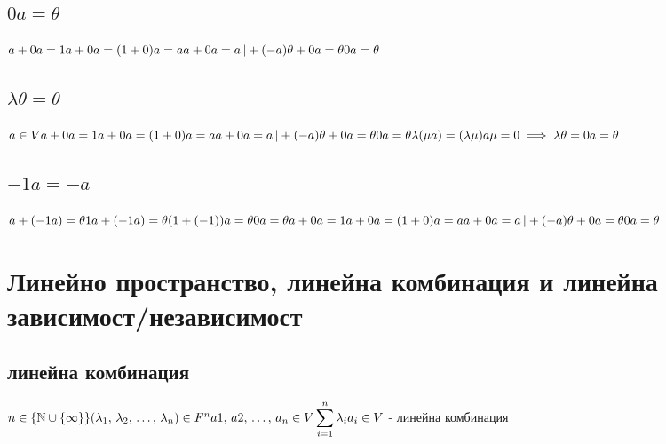 \documentclass{article}
\begin{document}
    \subsection{\(0a = \theta\)}
    \(a + 0a = 1a + 0a = (1 + 0)a = a\\
    a + 0a = a \, | + (-a)\\
    \theta + 0a = \theta\\
    0a = \theta\)
    \subsection{\(\lambda \theta = \theta\)}
    \(a \in V\\
    a + 0a = 1a + 0a = (1 + 0)a = a\\
    a + 0a = a \, | + (-a)\\
    \theta + 0a = \theta\\
    0a = \theta\\
    \lambda(\mu a) = (\lambda \mu)a\\
    \mu = 0\\
    \implies \lambda \theta = 0a = \theta\)
    \subsection{\(-1a = -a\)}
    \(a + (-1a) = \theta\\
    1a + (-1a) = \theta\\
    (1 + (-1))a = \theta\\
    0a = \theta\\
    a + 0a = 1a + 0a = (1 + 0)a = a\\
    a + 0a = a \, | + (-a)\\
    \theta + 0a = \theta\\
    0a = \theta\)
    \section{Линейно пространство, линейна комбинация и линейна зависимост/независимост}
    \subsection{линейна комбинация}
    \(n \in \{\mathbb{N} \cup \{ \infty \}\}\\
    (\lambda_1, \, \lambda_2, \, \dots, \, \lambda_n) \in F^n\\
    a1, \, a2, \, \dots, \, a_n \in V\\
    \displaystyle\sum_{i=1}^{n} \lambda_i a_i \in V\) - линейна комбинация
\end{document}
